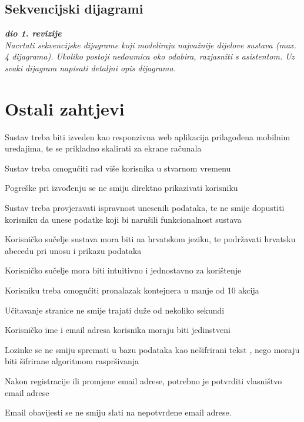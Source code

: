             \clearpage
            
			\eject		

			\subsection{Sekvencijski dijagrami}

			\textbf{\textit{dio 1. revizije}}\\
			
			\textit{Nacrtati sekvencijske dijagrame koji modeliraju najvažnije dijelove sustava (max. 4 dijagrama). Ukoliko postoji nedoumica oko odabira, razjasniti s asistentom. Uz svaki dijagram napisati detaljni opis dijagrama.}
			\eject

			\section{Ostali zahtjevi}

			\begin{packed_item}
				\item Sustav treba biti izveden kao responzivna web aplikacija prilagođena mobilnim uređajima, te se prikladno skalirati za ekrane računala
				\item Sustav treba omogućiti rad više korisnika u stvarnom vremenu
				\item Pogreške pri izvođenju se ne smiju direktno prikazivati korisniku
				\item Sustav treba provjeravati ispravnost unesenih podataka, te ne smije dopustiti korisniku da unese podatke koji bi narušili funkcionalnost sustava
				\item Korisničko sučelje sustava mora biti na hrvatskom jeziku, te podržavati hrvatsku abecedu pri unosu i prikazu podataka
				\item Korisničko sučelje mora biti intuitivno i jednostavno za korištenje
				\item Korisniku treba omogućiti pronalazak kontejnera u manje od 10 akcija
				\item Učitavanje stranice ne smije trajati duže od nekoliko sekundi
				\\
				\item Korisničko ime i email adresa korisnika moraju biti jedinstveni
				\item Lozinke se ne smiju spremati u bazu podataka kao nešifrirani tekst , nego moraju biti šifrirane algoritmom raspršivanja
				\item Nakon registracije ili promjene email adrese, potrebno je potvrditi vlasništvo email adrese
				\item Email obavijesti se ne smiju slati na nepotvrđene email adrese.
			\end{packed_item}
